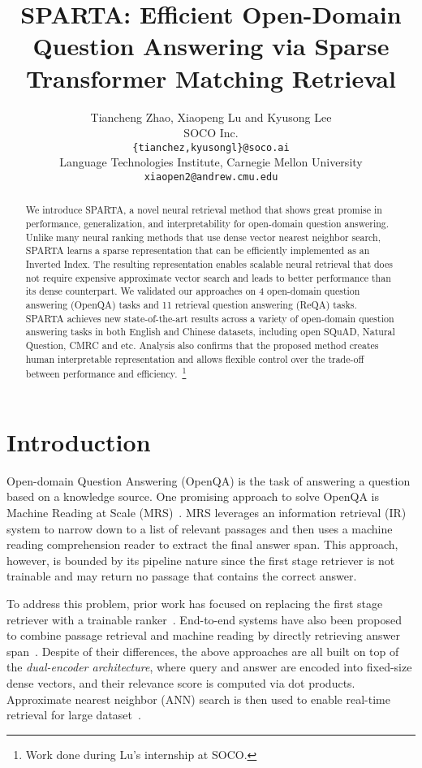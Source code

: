 \documentclass[11pt,a4paper]{article}
\title{SPARTA: Efficient Open-Domain Question Answering via Sparse Transformer Matching Retrieval}
\author{
  Tiancheng Zhao, Xiaopeng Lu and Kyusong Lee \\
  SOCO Inc. \\
  \texttt{\{tianchez,kyusongl\}@soco.ai} \\
  Language Technologies Institute, Carnegie Mellon University\\
  \texttt{xiaopen2@andrew.cmu.edu}
  }
\begin{document}
\maketitle
\begin{abstract}
{
We introduce SPARTA, a novel neural retrieval method that shows great promise in performance, generalization, and interpretability for open-domain question answering. Unlike many neural ranking methods that use dense vector nearest neighbor search, SPARTA learns a sparse representation that can be efficiently implemented as an Inverted Index. The resulting representation enables scalable neural retrieval that does not require expensive approximate vector search and leads to better performance than its dense counterpart. We validated our approaches on 4 open-domain question answering (OpenQA) 
tasks and 11 retrieval question answering (ReQA) tasks. SPARTA achieves new state-of-the-art results across a variety of open-domain question answering tasks in both English and Chinese datasets, including open SQuAD, Natural Question, CMRC and etc. Analysis also confirms that the proposed method creates human interpretable representation and allows flexible control over the trade-off between performance and efficiency.~\footnote{Work done during Lu's internship at SOCO.}
}

\end{abstract}

\section{Introduction}
Open-domain Question Answering (OpenQA) is the task of answering a question based on a knowledge source. One promising approach to solve OpenQA is Machine Reading at Scale (MRS)~\cite{chen2017reading}. MRS leverages an information retrieval (IR) system to narrow down to a list of relevant passages and then uses a machine reading comprehension reader to extract the final answer span. This approach, however, is bounded by its pipeline nature since the first stage retriever is not trainable and may return no passage that contains the correct answer. 

To address this problem, prior work has focused on replacing the first stage retriever with a trainable ranker~\cite{chidambaram2018learning,lee2018ranking,wang2018r}. End-to-end systems have also been proposed to combine passage retrieval and machine reading by directly retrieving answer span~\cite{seo2019real,lee2019latent}. Despite of their differences, the above approaches are all built on top of the \textit{dual-encoder architecture}, where query and answer are encoded into fixed-size dense vectors, and their relevance score is computed via dot products. Approximate nearest neighbor (ANN) search is then used to enable real-time retrieval for large dataset~\cite{shrivastava2014asymmetric}. 
\end{document}
